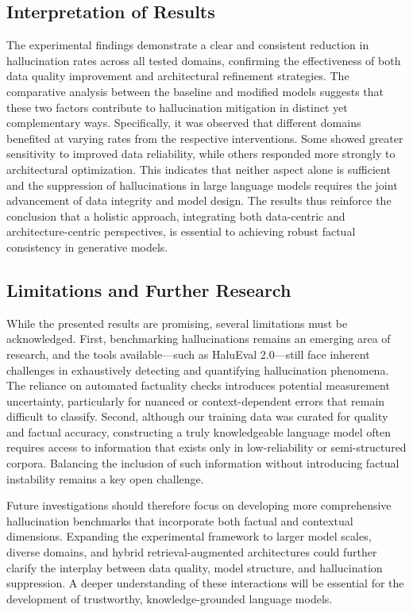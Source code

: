 \subsection{Interpretation of Results}

The experimental findings demonstrate a clear and consistent reduction in hallucination rates across all tested domains, confirming the effectiveness of both data quality improvement and architectural refinement strategies. The comparative analysis between the baseline and modified models suggests that these two factors contribute to hallucination mitigation in distinct yet complementary ways. Specifically, it was observed that different domains benefited at varying rates from the respective interventions. Some showed greater sensitivity to improved data reliability, while others responded more strongly to architectural optimization. This indicates that neither aspect alone is sufficient and the suppression of hallucinations in large language models requires the joint advancement of data integrity and model design. The results thus reinforce the conclusion that a holistic approach, integrating both data-centric and architecture-centric perspectives, is essential to achieving robust factual consistency in generative models.

\subsection{Limitations and Further Research}

While the presented results are promising, several limitations must be acknowledged. First, benchmarking hallucinations remains an emerging area of research, and the tools available—such as HaluEval 2.0—still face inherent challenges in exhaustively detecting and quantifying hallucination phenomena. The reliance on automated factuality checks introduces potential measurement uncertainty, particularly for nuanced or context-dependent errors that remain difficult to classify. Second, although our training data was curated for quality and factual accuracy, constructing a truly knowledgeable language model often requires access to information that exists only in low-reliability or semi-structured corpora. Balancing the inclusion of such information without introducing factual instability remains a key open challenge. 

Future investigations should therefore focus on developing more comprehensive hallucination benchmarks that incorporate both factual and contextual dimensions. Expanding the experimental framework to larger model scales, diverse domains, and hybrid retrieval-augmented architectures could further clarify the interplay between data quality, model structure, and hallucination suppression. A deeper understanding of these interactions will be essential for the development of trustworthy, knowledge-grounded language models.